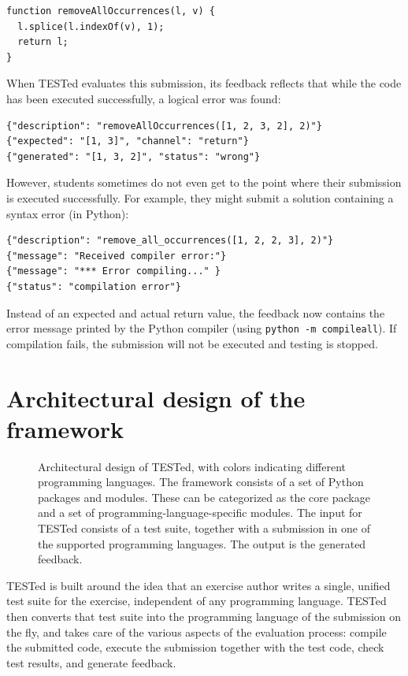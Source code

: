 \documentclass[../main]{subfiles}
\begin{document}
\begin{verbatim}
function removeAllOccurrences(l, v) {
  l.splice(l.indexOf(v), 1);
  return l;
}
\end{verbatim}

When TESTed evaluates this submission, its feedback reflects that while the code has been executed successfully, a logical error was found:

\begin{verbatim}
{"description": "removeAllOccurrences([1, 2, 3, 2], 2)"}
{"expected": "[1, 3]", "channel": "return"}
{"generated": "[1, 3, 2]", "status": "wrong"}
\end{verbatim}

However, students sometimes do not even get to the point where their submission is executed successfully.
For example, they might submit a solution containing a syntax error (in Python):

\begin{verbatim}
{"description": "remove_all_occurrences([1, 2, 2, 3], 2)"}
{"message": "Received compiler error:"}
{"message": "*** Error compiling..." }
{"status": "compilation error"}
\end{verbatim}

Instead of an expected and actual return value, the feedback now contains the error message printed by the Python compiler (using \texttt{python -m compileall}).
If compilation fails, the submission will not be executed and testing is stopped.

\section{Architectural design of the framework}\label{sec:tested1-architectural-design}

\begin{figure}[t]
    \centering
    
    \caption{
        Architectural design of TESTed, with colors indicating different programming languages.
        The framework consists of a set of Python packages and modules.
        These can be categorized as the core package and a set of programming-language-specific modules.
        The input for TESTed consists of a test suite, together with a submission in one of the supported programming languages.
        The output is the generated feedback.
    }
    \label{fig:conceptual-design}
\end{figure}

TESTed is built around the idea that an exercise author writes a single, unified test suite for the exercise, independent of any programming language.
TESTed then converts that test suite into the programming language of the submission on the fly, and takes care of the various aspects of the evaluation process: compile the submitted code, execute the submission together with the test code, check test results, and generate feedback.
\end{document}
